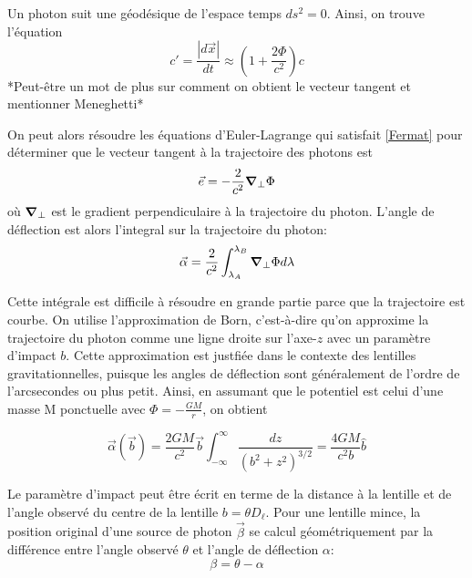 Un photon suit une géodésique de l'espace temps $ds^{2} = 0$. Ainsi, on trouve 
l'équation
\begin{equation}\label{eq:refraction index}
        c' = \frac{|d\vec{x}|}{dt} \approx \left( 1 + \frac{2\Phi}{c^{2}} \right)c
\end{equation} 
*Peut-être un mot de plus sur comment on obtient le vecteur tangent et mentionner 
Meneghetti*

On peut alors résoudre les équations d'Euler-Lagrange qui satisfait \eqref{Fermat} 
pour déterminer que le vecteur tangent à la trajectoire des photons est 
\begin{equation}\label{eq:vecteur tangent}
        \vec{e} = -\frac{2}{c^{2}} \grad_\perp \Phi
\end{equation} 
où $\grad_\perp$ est le gradient perpendiculaire à la trajectoire du photon.
L'angle de déflection est alors l'integral sur la trajectoire du photon:
\begin{equation}\label{eq:deflection true}
        \vec{\alpha} = \frac{2}{c^{2}}\int_{\lambda_A}^{\lambda_B} \grad_\perp \Phi d\lambda
\end{equation} 

Cette intégrale est difficile à résoudre en grande partie parce que la trajectoire est courbe. 
On utilise l'approximation de Born, c'est-à-dire qu'on approxime la trajectoire 
du photon comme une ligne droite sur l'axe-$z$ avec un paramètre d'impact $b$. Cette approximation est justfiée 
dans le contexte des lentilles gravitationnelles, puisque les angles de déflection sont généralement de 
l'ordre de l'arcsecondes ou plus petit. Ainsi, en assumant que le potentiel est celui d'une masse M
ponctuelle avec $\displaystyle \Phi = -\frac{GM}{r}$,
on obtient

\begin{equation}\label{eq:deflection approx}
        \vec{\alpha}(\vec{b}) = \frac{2GM}{c^{2}} \vec{b} \int_{-\infty }^{\infty } \frac{dz}{(b^{2} + z^{2})^{3/2}} 
        = \frac{4GM}{c^{2}b} \hat{b}
\end{equation} 

Le paramètre d'impact peut être écrit en terme de la distance à la lentille et de l'angle 
observé du centre de la lentille $b = \theta D_{\ell}$. Pour une lentille mince, 
la position original d'une source de photon $\vec{\beta}$ se calcul géométriquement 
par la différence entre l'angle observé $\theta$ et l'angle de déflection $\alpha$:
\begin{equation}\label{eq:equation lentille}
       \beta = \theta - \alpha 
\end{equation} 

